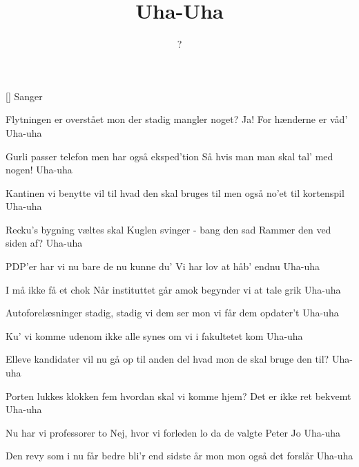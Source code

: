 \documentclass[a4paper,11pt]{article}
\title{Uha-Uha}
\author{?}
\begin{document}
\maketitle

\begin{roles}
[] Sanger
\end{roles}

\begin{song}
Flytningen er overstået
mon der stadig mangler noget?
Ja!  For hænderne er våd'
Uha-uha

Gurli passer telefon
men har også eksped'tion
Så hvis man man skal tal' med nogen!
Uha-uha

Kantinen vi benytte vil
til hvad den skal bruges til
men også no'et til kortenspil
Uha-uha

Recku's bygning væltes skal
Kuglen svinger - bang den sad
Rammer den ved siden af?
Uha-uha

PDP'er har vi nu
bare de nu kunne du'
Vi har lov at håb' endnu
Uha-uha

I må ikke få et chok
Når instituttet går amok
begynder vi at tale grik
Uha-uha

Autoforelæsninger
stadig, stadig vi dem ser
mon vi får dem opdater't
Uha-uha

Ku' vi komme udenom
ikke alle synes om
vi i fakultetet kom
Uha-uha

Elleve kandidater vil
nu gå op til anden del
hvad mon de skal bruge den til?
Uha-uha

Porten lukkes klokken fem
hvordan skal vi komme hjem?
Det er ikke ret bekvemt
Uha-uha

Nu har vi professorer to
Nej, hvor vi forleden lo
da de valgte Peter Jo
Uha-uha

Den revy som i nu får
bedre bli'r end sidste år
mon mon også det forslår
Uha-uha
\end{song}
\end{document}
